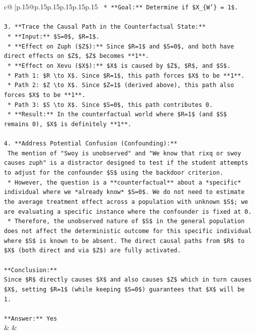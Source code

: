 \documentclass{article}
\begin{document}
{\begin{supertabular}{c@{$\;$}|p{.15\linewidth}@{}p{.15\linewidth}p{.15\linewidth}p{.15\linewidth}p{.15\linewidth}p{.15\linewidth}}
{{{\texttt{    *   **Goal:** Determine if \$X\_\{W'\} = 1\$.} \\
\\ 
\texttt{3.  **Trace the Causal Path in the Counterfactual State:**} \\
\texttt{    *   **Input:** \$S=0\$, \$R=1\$.} \\
\texttt{    *   **Effect on Zuph (\$Z\$):** Since \$R=1\$ and \$S=0\$, and both have direct effects on \$Z\$, \$Z\$ becomes **1**.} \\
\texttt{    *   **Effect on Xevu (\$X\$):** \$X\$ is caused by \$Z\$, \$R\$, and \$S\$.} \\
\texttt{        *   Path 1: \$R \textbackslash{}to X\$. Since \$R=1\$, this path forces \$X\$ to be **1**.} \\
\texttt{        *   Path 2: \$Z \textbackslash{}to X\$. Since \$Z=1\$ (derived above), this path also forces \$X\$ to be **1**.} \\
\texttt{        *   Path 3: \$S \textbackslash{}to X\$. Since \$S=0\$, this path contributes 0.} \\
\texttt{    *   **Result:** In the counterfactual world where \$R=1\$ (and \$S\$ remains 0), \$X\$ is definitely **1**.} \\
\\ 
\texttt{4.  **Address Potential Confusion (Confounding):**} \\
\texttt{    The mention of "Swoy is unobserved" and "We know that rixq or swoy causes zuph" is a distractor designed to test if the student attempts to adjust for the confounder \$S\$ using the backdoor criterion.} \\
\texttt{    *   However, the question is a **counterfactual** about a *specific* individual where we *already know* \$S=0\$. We do not need to estimate the average treatment effect across a population with unknown \$S\$; we are evaluating a specific instance where the confounder is fixed at 0.} \\
\texttt{    *   Therefore, the unobserved nature of \$S\$ in the general population does not affect the deterministic outcome for this specific individual where \$S\$ is known to be absent. The direct causal paths from \$R\$ to \$X\$ (both direct and via \$Z\$) are fully activated.} \\
\\ 
\texttt{**Conclusion:**} \\
\texttt{Since \$R\$ directly causes \$X\$ and also causes \$Z\$ which in turn causes \$X\$, setting \$R=1\$ (while keeping \$S=0\$) guarantees that \$X\$ will be 1.} \\
\\ 
\texttt{**Answer:** Yes} \\
            }
        }
    }
    & & \\ \\


\end{supertabular}}
\end{document}
